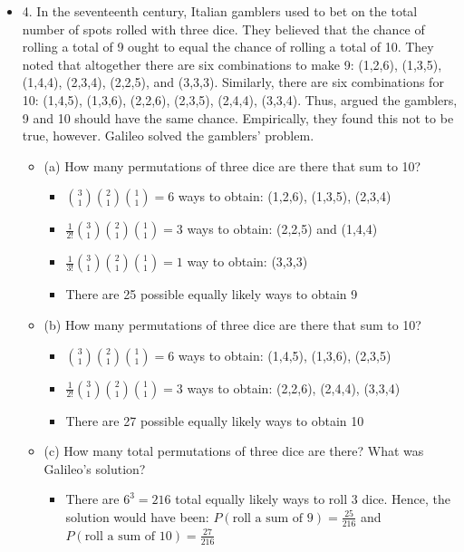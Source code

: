 \documentclass{article}
\begin{document}
\begin{itemize}
\begin{itemize}
    \end{itemize}
    \item 4. In the seventeenth century, Italian gamblers used to bet on the total number of spots rolled with three dice. They believed that the chance of rolling a total of 9 ought to equal the chance of rolling a total of 10. They noted that altogether there are six combinations to make 9: (1,2,6), (1,3,5), (1,4,4), (2,3,4), (2,2,5), and (3,3,3). Similarly, there are six combinations for 10: (1,4,5), (1,3,6), (2,2,6), (2,3,5), (2,4,4), (3,3,4). Thus, argued the gamblers, 9 and 10 should have the same chance. Empirically, they found this not to be true, however. Galileo solved the gamblers’ problem.
    \begin{itemize}
        \item (a) How many permutations of three dice are there that sum to 10?
        \begin{itemize}
            \item $\binom{3}{1}\binom{2}{1}\binom{1}{1} = 6$ ways to obtain: (1,2,6), (1,3,5), (2,3,4)
            \item $\frac{1}{2!}\binom{3}{1}\binom{2}{1}\binom{1}{1} = 3$ ways to obtain: (2,2,5) and (1,4,4)
            \item $\frac{1}{3!} \binom{3}{1}\binom{2}{1}\binom{1}{1} = 1$ way to obtain: (3,3,3)
            \item There are 25 possible equally likely ways to obtain 9
        \end{itemize}
        \item (b) How many permutations of three dice are there that sum to 10?
        \begin{itemize}
            \item $\binom{3}{1}\binom{2}{1}\binom{1}{1} = 6$ ways to obtain: (1,4,5), (1,3,6), (2,3,5)
            \item $\frac{1}{2!}\binom{3}{1}\binom{2}{1}\binom{1}{1} = 3$ ways to obtain: (2,2,6), (2,4,4), (3,3,4)
            \item There are 27 possible equally likely ways to obtain 10
        \end{itemize}
        \item (c) How many total permutations of three dice are there? What was Galileo's solution?
        \begin{itemize}
            \item There are $6^3=216$ total equally likely ways to roll 3 dice. Hence, the solution would have been: $P(\text{roll a sum of 9})=\frac{25}{216}$ and $P(\text{roll a sum of 10})=\frac{27}{216}$

\end{itemize}
\end{itemize}
\end{itemize}
\end{document}
